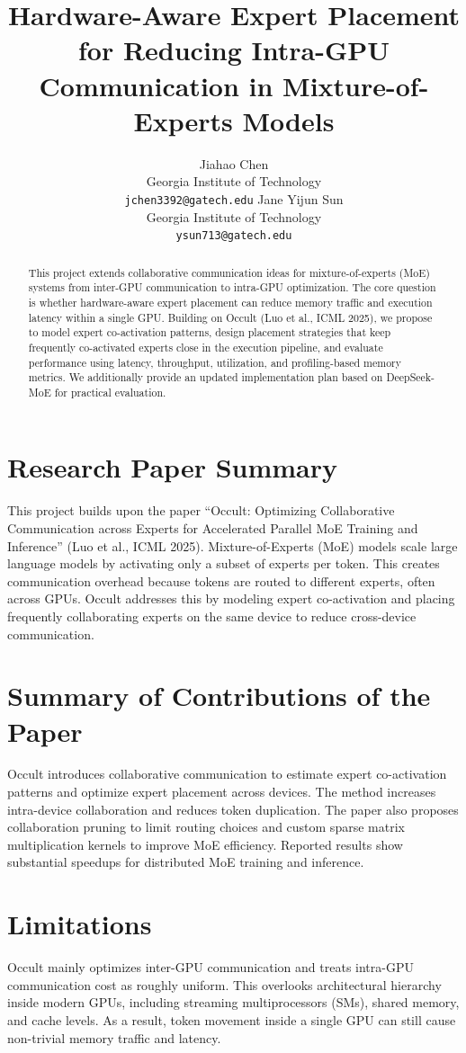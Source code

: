 \documentclass{article} %
\title{Hardware-Aware Expert Placement for Reducing Intra-GPU Communication in Mixture-of-Experts Models}
\author{Jiahao Chen \\
Georgia Institute of Technology \\
\texttt{jchen3392@gatech.edu}
\And
Jane Yijun Sun \\
Georgia Institute of Technology \\
\texttt{ysun713@gatech.edu}
}
\begin{document}
\maketitle

\begin{abstract}
This project extends collaborative communication ideas for mixture-of-experts (MoE) systems from inter-GPU communication to intra-GPU optimization. The core question is whether hardware-aware expert placement can reduce memory traffic and execution latency within a single GPU. Building on Occult (Luo et al., ICML 2025), we propose to model expert co-activation patterns, design placement strategies that keep frequently co-activated experts close in the execution pipeline, and evaluate performance using latency, throughput, utilization, and profiling-based memory metrics. We additionally provide an updated implementation plan based on DeepSeek-MoE for practical evaluation.
\end{abstract}

\section{Research Paper Summary}
This project builds upon the paper ``Occult: Optimizing Collaborative Communication across Experts for Accelerated Parallel MoE Training and Inference'' (Luo et al., ICML 2025). Mixture-of-Experts (MoE) models scale large language models by activating only a subset of experts per token. This creates communication overhead because tokens are routed to different experts, often across GPUs. Occult addresses this by modeling expert co-activation and placing frequently collaborating experts on the same device to reduce cross-device communication.

\section{Summary of Contributions of the Paper}
Occult introduces collaborative communication to estimate expert co-activation patterns and optimize expert placement across devices. The method increases intra-device collaboration and reduces token duplication. The paper also proposes collaboration pruning to limit routing choices and custom sparse matrix multiplication kernels to improve MoE efficiency. Reported results show substantial speedups for distributed MoE training and inference.

\section{Limitations}
Occult mainly optimizes inter-GPU communication and treats intra-GPU communication cost as roughly uniform. This overlooks architectural hierarchy inside modern GPUs, including streaming multiprocessors (SMs), shared memory, and cache levels. As a result, token movement inside a single GPU can still cause non-trivial memory traffic and latency.
\end{document}
